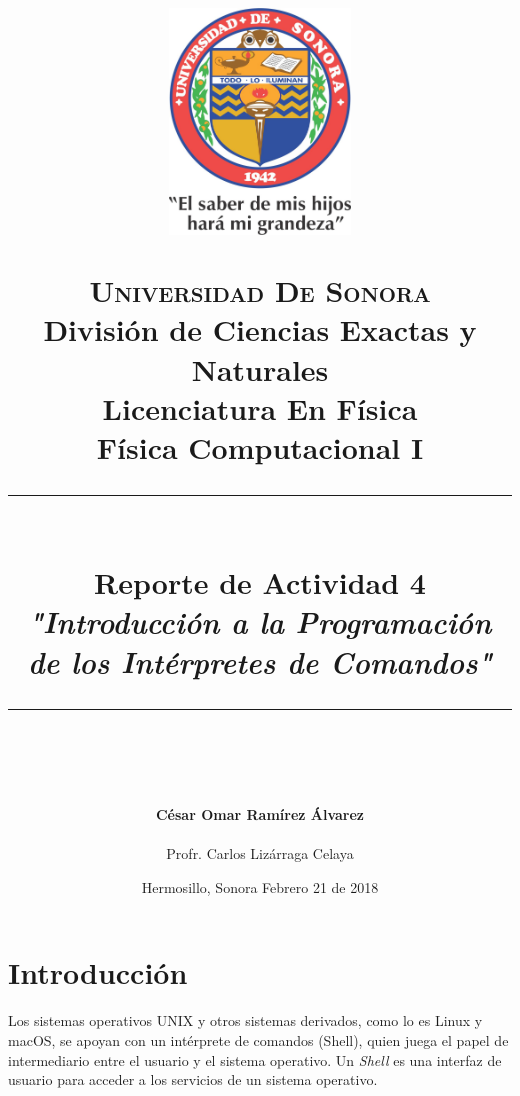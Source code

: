 \documentclass[12pt]{article}
\newcommand{\HRule}[1]{\rule{\linewidth}{#1}}
\begin{document}
\begin{titlepage}

\title{ \normalsize 
        \begin{center}
        \includegraphics[height=6cm]{Logo.jpg}
        \end{center}
        \LARGE \textsc{\textbf{Universidad De Sonora}} \\ \bigskip
		\Large División de Ciencias Exactas y Naturales \\
        Licenciatura En Física \\ \bigskip
        \bigskip
        Física Computacional I
		\\ [0.1cm]  
		\HRule{2pt} \\
		\Large \textbf{{Reporte de Actividad 4}} \\
        \textit{\textbf{"Introducción a la Programación de los Intérpretes de Comandos"}}
		\HRule{2pt} \\
		\normalsize \vspace*{0.001\baselineskip}}
        
\date{\bigskip \Large Hermosillo, Sonora  \hspace*{\fill}  Febrero 21 de 2018}

        
\author{
		\Large\textbf{ César Omar Ramírez Álvarez} \\ \bigskip
        \\ \bigskip
       \Large Profr. Carlos Lizárraga Celaya}
       \end{titlepage}
       \maketitle
       

\newpage
\pagestyle{plain}
\section*{Introducción}
Los sistemas operativos UNIX y otros sistemas derivados, como lo es Linux y macOS, se apoyan con un intérprete de comandos (Shell), quien juega el papel de intermediario entre el usuario y el sistema operativo. Un \textit{Shell} es una interfaz de usuario para acceder a los servicios de un sistema operativo.\\
\end{document}
